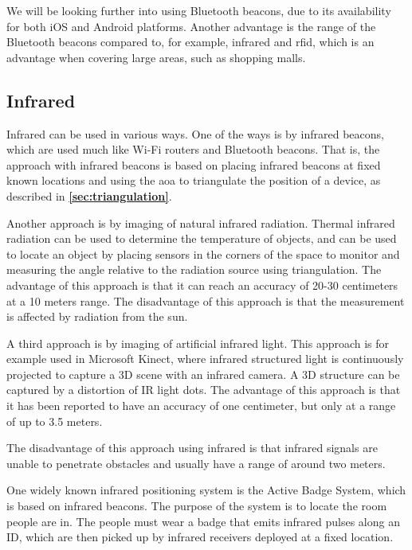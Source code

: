 We will be looking further into using Bluetooth beacons, due to its availability for both iOS and Android platforms. Another advantage is the range of the Bluetooth beacons compared to, for example, infrared and \gls{rfid}, which is an advantage when covering large areas, such as shopping malls.

\subsection{Infrared}
Infrared can be used in various ways. One of the ways is by infrared beacons, which are used much like Wi-Fi routers and Bluetooth beacons. That is, the approach with infrared beacons is based on placing infrared beacons at fixed known locations and using the \gls{aoa} to triangulate the position of a device, as described in \textbf{\autoref{sec:triangulation}}.\cite{HabilitationThesis}

Another approach is by imaging of natural infrared radiation. Thermal infrared radiation can be used to determine the temperature of objects, and can be used to locate an object by placing sensors in the corners of the space to monitor and measuring the angle relative to the radiation source using triangulation.
The advantage of this approach is that it can reach an accuracy of 20-30 centimeters at a 10 meters range.
The disadvantage of this approach is that the measurement is affected by radiation from the sun.\cite{HabilitationThesis}

A third approach is by imaging of artificial infrared light. This approach is for example used in Microsoft Kinect, where infrared structured light is continuously projected to capture a 3D scene with an infrared camera. A 3D structure can be captured by a distortion of IR light dots.
The advantage of this approach is that it has been reported to have an accuracy of one centimeter, but only at a range of up to 3.5 meters.\cite{HabilitationThesis}

The disadvantage of this approach using infrared is that infrared signals are unable to penetrate obstacles and usually have a range of around two meters\cite{HabilitationThesis}.

One widely known infrared positioning system is the Active Badge System, which is based on infrared beacons. The purpose of the system is to locate the room people are in. The people must wear a badge that emits infrared pulses along an ID, which are then picked up by infrared receivers deployed at a fixed location.\cite{HabilitationThesis}

